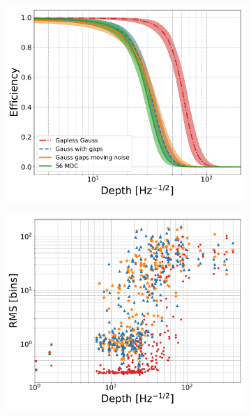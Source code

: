 \begin{figure}[p]
\begin{subfigure}[h]{0.49\columnwidth}
\includegraphics[scale=0.3]{C3_soap/s6_efficiency_depth.pdf}
\subcaption{}
\label{gausss6:eff_depth}
\end{subfigure}
\begin{subfigure}[h]{0.49\columnwidth}
\includegraphics[scale=0.3]{C3_soap/gauss_s6_frac_depth.pdf}
\subcaption{}
\label{gausss6:res_depth}
\end{subfigure}


\end{figure}
